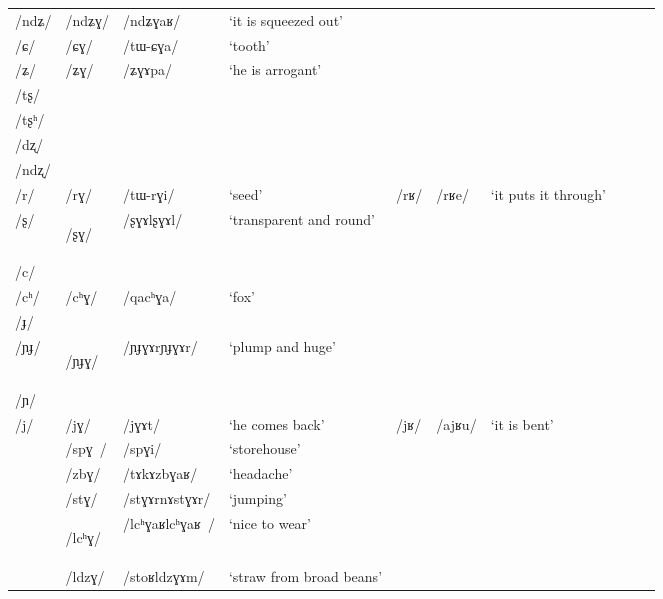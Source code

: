 \documentclass[oneside,a4paper,11pt]{article}
\newcommand{\ipa}[1]{\mbox{\phon/#1/}}
\newcommand{\deux}[1]{\ipa{#1}\addtocounter{2clusters}{1}}
\newcommand{\trois}[1]{\ipa{#1}\addtocounter{3clusters}{1}}
\newcommand{\idph}[1]{\cellcolor{gray}\textbf{#1}}
\begin{document}
\begin{table}
{\begin{tabular}{llllllllll}
\ipa{ndʑ} & \deux{ndʑɣ} & \ipa{ndʑɣaʁ} & `it is squeezed out' & & & \\ 
\ipa{ɕ} & \deux{ɕɣ} & \ipa{tɯ-ɕɣa} & `tooth' & & & \\ 
\ipa{ʑ} & \deux{ʑɣ} & \ipa{ʑɣɤpa} & `he is arrogant' & & & \\ 
\ipa{tʂ} & & & & & & \\ 
\ipa{tʂʰ} & & & & & & \\ 
\ipa{dʐ} & & & & & & \\ 
\ipa{ndʐ} & & & & & & \\ 
\ipa{r} & \deux{rɣ} & \ipa{tɯ-rɣi} & `seed' &\deux{rʁ} &\ipa{rʁe} & `it puts it through' \\ 
\ipa{ʂ} & \deux{ʂɣ} \idph{} & \ipa{ʂɣɤlʂɣɤl} & `transparent and round' & & & \\ 
\ipa{c} & & & & & & \\ 
\ipa{cʰ} & \deux{cʰɣ} & \ipa{qacʰɣa} & `fox' & & & \\ 
\ipa{ɟ} & & & & & & \\ 
\ipa{ɲɟ} & \deux{ɲɟɣ} \idph{} & \ipa{ɲɟɣɤrɲɟɣɤr} & `plump and huge' & & & \\ 
\ipa{ɲ} & & & & & & \\ 
\ipa{j} & \deux{jɣ} & \ipa{jɣɤt} & `he comes back' &\deux{jʁ} &\ipa{ajʁu} & `it is bent' \\ 
\midrule      
 &\trois{spɣ } &\ipa{spɣi} & `storehouse' & & &\\
 &\trois{zbɣ} &\ipa{tɤkɤzbɣaʁ} & `headache' & & &\\
 &\trois{stɣ} &\ipa{stɣɤrnɤstɣɤr} & `jumping' & & &\\
\midrule      
 &\trois{lcʰɣ} \idph{} &\ipa{lcʰɣaʁlcʰɣaʁ } & `nice to wear' & & &\\
 &\trois{ldzɣ} &\ipa{stoʁldzɣɤm} & `straw from broad beans' & & &\\

\end{tabular}}
\end{table}
\end{document}
